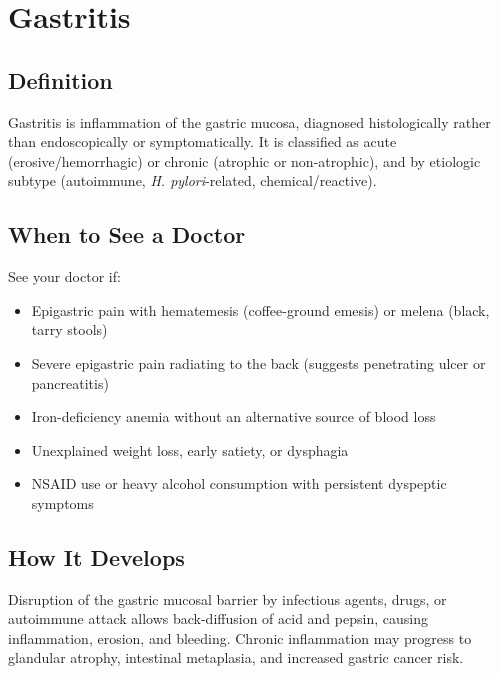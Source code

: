 \chapter{Gastritis}

\section*{Definition}
Gastritis is inflammation of the gastric mucosa, diagnosed histologically rather than endoscopically or symptomatically. It is classified as acute (erosive/hemorrhagic) or chronic (atrophic or non-atrophic), and by etiologic subtype (autoimmune, \textit{H. pylori}-related, chemical/reactive).

\section*{When to See a Doctor}
See your doctor if:
\begin{itemize}
  \item Epigastric pain with hematemesis (coffee-ground emesis) or melena (black, tarry stools)
  \item Severe epigastric pain radiating to the back (suggests penetrating ulcer or pancreatitis)
  \item Iron-deficiency anemia without an alternative source of blood loss
  \item Unexplained weight loss, early satiety, or dysphagia
  \item NSAID use or heavy alcohol consumption with persistent dyspeptic symptoms
\end{itemize}

\section*{How It Develops}
Disruption of the gastric mucosal barrier by infectious agents, drugs, or autoimmune attack allows back-diffusion of acid and pepsin, causing inflammation, erosion, and bleeding. Chronic inflammation may progress to glandular atrophy, intestinal metaplasia, and increased gastric cancer risk.

